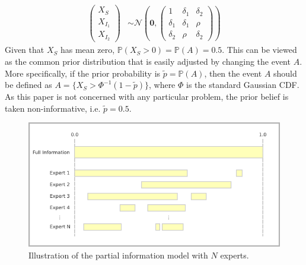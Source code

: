 \documentclass[11pt]{article}
\renewcommand{\P}{\mathbb{P}}
\theoremstyle{definition}
\theoremstyle{definition}
\begin{document}
\begin{align}
\left(\begin{matrix} X_S \\ X_{I_1}\\ X_{I_2} \end{matrix}\right) &\sim \mathcal{N}\left(
 \boldsymbol{0},  \left(\begin{matrix} 
1 & \delta_1 & \delta_2\\
\delta_1 & \delta_1 &\rho\\
\delta_2 & \rho & \delta_2
 \end{matrix}\right)\right) \label{twoExperts}
\end{align}
Given that $X_S$ has mean zero, $\P(X_S > 0) = \P(A) = 0.5$. This can be viewed as the common prior distribution that is easily adjusted by changing the event $A$. More specifically, if the prior probability is $\tilde{p} = \P(A)$, then the event $A$ should be defined as $A = \{ X_S > \Phi^{-1}(1-\tilde{p}) \}$, where $\Phi$ is the standard Gaussian CDF. As this paper is not concerned with any particular problem, the prior belief is taken non-informative, i.e. $\tilde{p} = 0.5$.  

\begin{figure}[htbp]
   \includegraphics[width = \textwidth]{N=N} %
   \caption{Illustration of the partial information model with $N$ experts.}
   \label{diagramN}
\end{figure}
\end{document}
